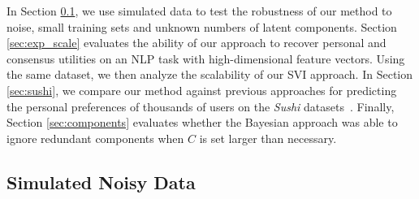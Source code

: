 In Section \ref{sec:exp_synth}, we use simulated data to test the robustness of our method to noise, small training sets and unknown numbers of latent components.
Section \ref{sec:exp_scale} evaluates the ability of our approach to
recover personal and consensus utilities on an NLP task with high-dimensional feature vectors.
Using the same dataset, we then analyze the scalability of our SVI approach. 
In Section \ref{sec:sushi}, 
we compare our method against previous approaches for predicting the 
personal preferences of thousands of users on the \emph{Sushi} datasets~\citep{kamishima2003nantonac}.
Finally, Section \ref{sec:components} evaluates whether the Bayesian approach was able to ignore redundant
components when $C$ is set larger than necessary.




\subsection{Simulated Noisy Data}\label{sec:exp_synth}

